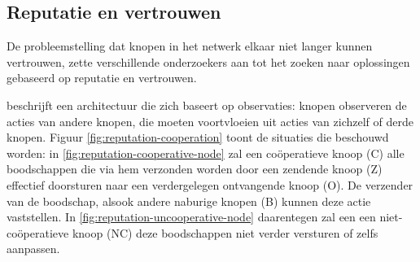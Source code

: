 
\subsection{Reputatie en vertrouwen}
\label{subsection:reputation}

De probleemstelling dat knopen in het netwerk elkaar niet langer kunnen
vertrouwen, zette verschillende onderzoekers aan tot het zoeken naar
oplossingen gebaseerd op reputatie en vertrouwen.

\citep{ganeriwal2008reputation} beschrijft een architectuur die zich baseert op
observaties: knopen observeren de acties van andere knopen, die moeten
voortvloeien uit acties van zichzelf of derde knopen. Figuur
\ref{fig:reputation-cooperation} toont de situaties die beschouwd worden: in
\ref{fig:reputation-cooperative-node} zal een co\"operatieve knoop (C) alle
boodschappen die via hem verzonden worden door een zendende knoop (Z) effectief
doorsturen naar een verdergelegen ontvangende knoop (O). De verzender van de
boodschap, alsook andere naburige knopen (B) kunnen deze actie vaststellen. In
\ref{fig:reputation-uncooperative-node} daarentegen zal een een
niet-co\"operatieve knoop (NC) deze boodschappen niet verder versturen of zelfs
aanpassen.

